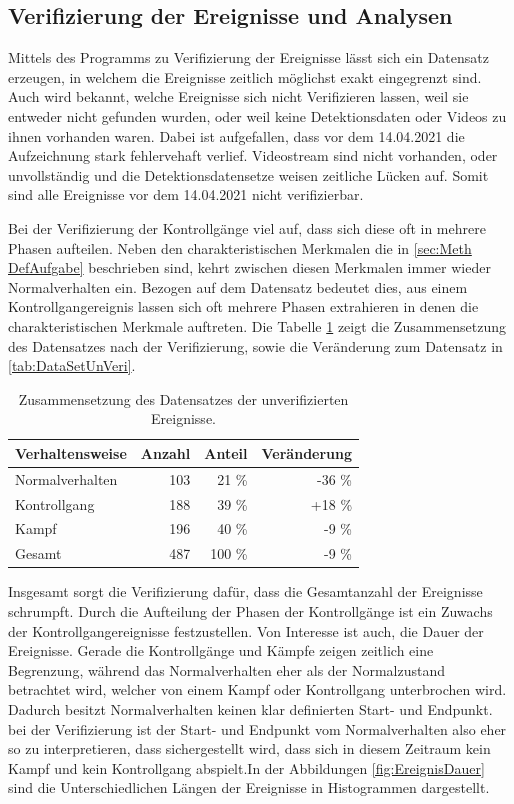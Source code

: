 \subsection{Verifizierung der Ereignisse und Analysen}
Mittels des Programms zu Verifizierung der Ereignisse lässt sich ein Datensatz erzeugen, in welchem die Ereignisse zeitlich möglichst exakt eingegrenzt sind. Auch wird bekannt, welche Ereignisse sich nicht Verifizieren lassen, weil sie entweder nicht gefunden wurden, oder weil keine Detektionsdaten oder Videos zu ihnen vorhanden waren. Dabei ist aufgefallen, dass vor dem 14.04.2021 die Aufzeichnung stark fehlervehaft verlief. Videostream sind nicht vorhanden, oder unvollständig und die Detektionsdatensetze weisen zeitliche Lücken auf. Somit sind alle Ereignisse vor dem 14.04.2021 nicht verifizierbar. \par

Bei der Verifizierung der Kontrollgänge viel auf, dass sich diese oft in mehrere Phasen aufteilen. Neben den charakteristischen Merkmalen die in \ref{sec:Meth DefAufgabe} beschrieben sind, kehrt zwischen diesen Merkmalen immer wieder Normalverhalten ein. Bezogen auf dem Datensatz bedeutet dies, aus einem Kontrollgangereignis lassen sich oft mehrere Phasen extrahieren in denen die  charakteristischen Merkmale auftreten. Die Tabelle \ref{tab:DataSetVeri} zeigt die Zusammensetzung des Datensatzes nach der Verifizierung, sowie die Veränderung zum Datensatz in \ref{tab:DataSetUnVeri}. 

\begin{table}[ht]
    \centering
    \caption{Zusammensetzung des Datensatzes der unverifizierten Ereignisse.}
    \begin{tabular}{|l|r|r|r|}
    \hline
        Verhaltensweise & Anzahl & Anteil & Veränderung\\
    \hline
        Normalverhalten & 103 & 21 \% & -36 \%\\
        Kontrollgang & 188 & 39 \% & +18 \%\\
        Kampf & 196 & 40 \% & -9 \%\\
    \hline
    \hline
        Gesamt & 487 & 100 \% & -9 \% \\
    \hline
    \end{tabular}
    \label{tab:DataSetVeri}
\end{table}

Insgesamt sorgt die Verifizierung dafür, dass die Gesamtanzahl der Ereignisse schrumpft. Durch die Aufteilung der Phasen der Kontrollgänge ist ein Zuwachs der Kontrollgangereignisse festzustellen. Von Interesse ist auch, die Dauer der Ereignisse. Gerade die Kontrollgänge und Kämpfe zeigen zeitlich eine Begrenzung, während das Normalverhalten eher als der Normalzustand betrachtet wird, welcher von einem Kampf oder Kontrollgang unterbrochen wird. Dadurch besitzt Normalverhalten keinen klar definierten Start- und Endpunkt. bei der Verifizierung ist der Start- und Endpunkt vom Normalverhalten also eher so zu interpretieren, dass sichergestellt wird, dass sich in diesem Zeitraum kein Kampf und kein Kontrollgang abspielt.In der Abbildungen \ref{fig:EreignisDauer} sind die Unterschiedlichen Längen der Ereignisse in Histogrammen dargestellt.

